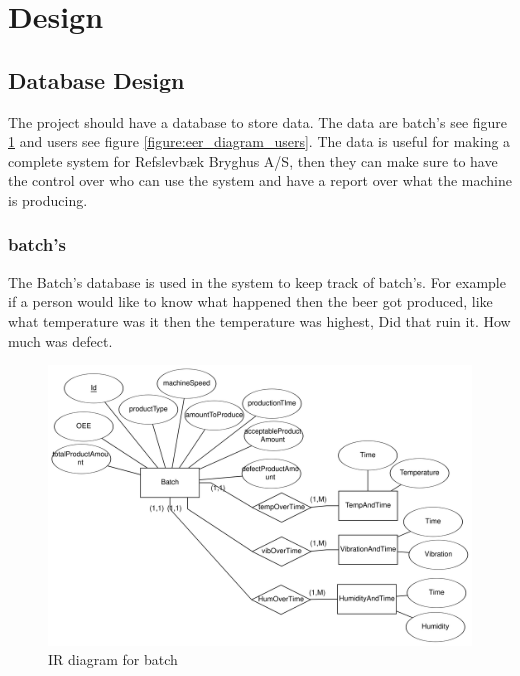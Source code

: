 \section{Design}

\subsection{Database Design}
The project should have a database to store data. 
The data are batch's see figure \ref{figure:eer_diagram_batch} and users see 
figure \ref{figure:eer_diagram_users}. The data is useful for making a complete
system for Refslevbæk Bryghus A/S, then they can make sure to have the control
over who can use the system and have a report over what the machine is producing.


\subsubsection{batch's}%
\label{ssub:batch_s}
The Batch's database is used in the system to keep track of batch's.
For example if a person would like to know what happened then the beer got produced,
like what temperature was it then the temperature was highest, Did that ruin it.
How much was defect.

\begin{figure}[ht]
\centering 
\includegraphics[width=0.8\linewidth]{images/eer_diagrams/database_EER_batch.png}
\caption{IR diagram for batch} 
\label{figure:eer_diagram_batch}
\end{figure}

